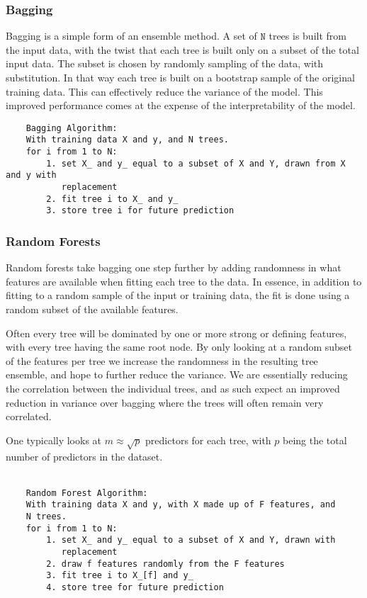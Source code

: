 \documentclass[11pt]{article}
\begin{document}
    \hypertarget{bagging}{%
\subsubsection{Bagging}\label{bagging}}

Bagging is a simple form of an ensemble method. A set of \(\texttt{N}\)
trees is built from the input data, with the twist that each tree is
built only on a subset of the total input data. The subset is chosen by
randomly sampling of the data, with substitution. In that way each tree
is built on a bootstrap sample of the original training data. This can
effectively reduce the variance of the model. This improved performance
comes at the expense of the interpretability of the model.

\begin{BVerbatim}
	Bagging Algorithm:
	With training data X and y, and N trees. 
	for i from 1 to N:
	    1. set X_ and y_ equal to a subset of X and Y, drawn from X and y with 
	       replacement
	    2. fit tree i to X_ and y_ 
	    3. store tree i for future prediction
\end{BVerbatim}


    \hypertarget{random-forests}{%
\subsubsection{Random Forests}\label{random-forests}}

Random forests take bagging one step further by adding randomness in
what features are available when fitting each tree to the data. In
essence, in addition to fitting to a random sample of the input or
training data, the fit is done using a random subset of the available
features. 

Often every tree will be dominated by one or more strong or
defining features, with every tree having the same root node. By only
looking at a random subset of the features per tree we increase the
randomness in the resulting tree ensemble, and hope to further reduce
the variance. We are essentially reducing the correlation between the
individual trees, and as such expect an improved reduction in variance
over bagging where the trees will often remain very correlated.

One typically looks at \(m \approx\sqrt{p}\) predictors for each tree,
with \(p\) being the total number of predictors in the dataset.
\\
\\
\begin{BVerbatim}
    Random Forest Algorithm: 
    With training data X and y, with X made up of F features, and
    N trees. 
    for i from 1 to N: 
        1. set X_ and y_ equal to a subset of X and Y, drawn with 
           replacement 
        2. draw f features randomly from the F features 
        3. fit tree i to X_[f] and y_ 
        4. store tree for future prediction
\end{BVerbatim}
\end{document}
